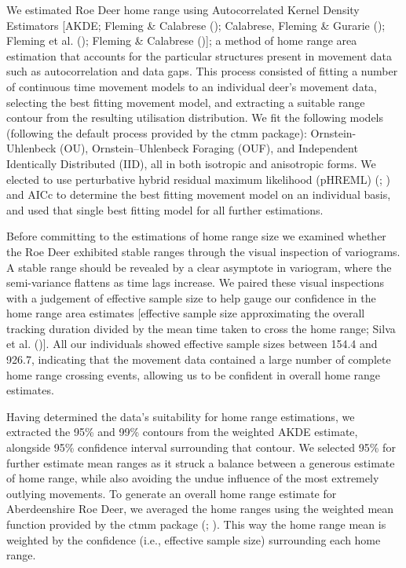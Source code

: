 \documentclass[10pt,a4paper]{article}
\begin{document}
We estimated Roe Deer home range using Autocorrelated Kernel Density Estimators {[}AKDE; Fleming \& Calabrese (); Calabrese, Fleming \& Gurarie (); Fleming et al. (); Fleming \& Calabrese (){]}; a method of home range area estimation that accounts for the particular structures present in movement data such as autocorrelation and data gaps.
This process consisted of fitting a number of continuous time movement models to an individual deer's movement data, selecting the best fitting movement model, and extracting a suitable range contour from the resulting utilisation distribution.
We fit the following models (following the default process provided by the ctmm package): Ornstein-Uhlenbeck (OU), Ornstein--Uhlenbeck Foraging (OUF), and Independent Identically Distributed (IID), all in both isotropic and anisotropic forms.
We elected to use perturbative hybrid residual maximum likelihood (pHREML) (; ) and AICc to determine the best fitting movement model on an individual basis, and used that single best fitting model for all further estimations.

Before committing to the estimations of home range size we examined whether the Roe Deer exhibited stable ranges through the visual inspection of variograms.
A stable range should be revealed by a clear asymptote in variogram, where the semi-variance flattens as time lags increase.
We paired these visual inspections with a judgement of effective sample size to help gauge our confidence in the home range area estimates {[}effective sample size approximating the overall tracking duration divided by the mean time taken to cross the home range; Silva et al. (){]}.
All our individuals showed effective sample sizes between 154.4 and 926.7, indicating that the movement data contained a large number of complete home range crossing events, allowing us to be confident in overall home range estimates.

Having determined the data's suitability for home range estimations, we extracted the 95\% and 99\% contours from the weighted AKDE estimate, alongside 95\% confidence interval surrounding that contour.
We selected 95\% for further estimate mean ranges as it struck a balance between a generous estimate of home range, while also avoiding the undue influence of the most extremely outlying movements.
To generate an overall home range estimate for Aberdeenshire Roe Deer, we averaged the home ranges using the weighted mean function provided by the ctmm package (; ).
This way the home range mean is weighted by the confidence (i.e., effective sample size) surrounding each home range.
\end{document}
